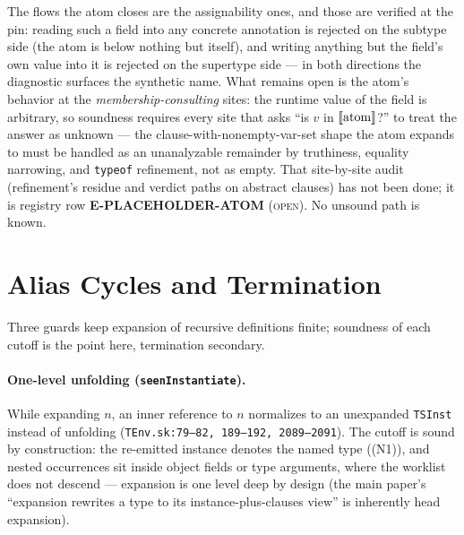 \documentclass[11pt]{article}
\begin{document}
The flows the atom closes are the assignability ones, and those are
verified at the pin: reading such a field into any concrete annotation
is rejected on the subtype side (the atom is below nothing but itself),
and writing anything but the field's own value into it is rejected on
the supertype side — in both directions the diagnostic surfaces the
synthetic name. What remains open is the atom's behavior at the
\emph{membership-consulting} sites: the runtime value of the field is
arbitrary, so soundness requires every site that asks ``is $v$ in
$\llbracket \text{atom} \rrbracket$?'' to treat the answer as unknown — the
clause-with-nonempty-var-set shape the atom expands to must be handled
as an unanalyzable remainder by truthiness, equality narrowing, and
\texttt{typeof} refinement, not as empty. That site-by-site audit
(refinement's residue and verdict paths on abstract clauses) has not
been done; it is registry row \textbf{E-PLACEHOLDER-ATOM}
(\textsc{open}). No unsound path is known.

\section{Alias Cycles and Termination}
\label{sec:cycles}

Three guards keep expansion of recursive definitions finite; soundness of
each cutoff is the point here, termination secondary.

\paragraph{One-level unfolding (\texttt{seenInstantiate}).}
While expanding $n$, an inner reference to $n$ normalizes to an
unexpanded \texttt{TSInst} instead of unfolding
(\texttt{TEnv.sk:79--82, 189--192, 2089--2091}). The cutoff is sound by
construction: the re-emitted instance denotes the named type ((N1)),
and nested occurrences sit inside object fields or type arguments, where the
worklist does not descend — expansion is one level deep by design (the
main paper's ``expansion rewrites a type to its instance-plus-clauses
view'' is inherently head expansion).
\end{document}
